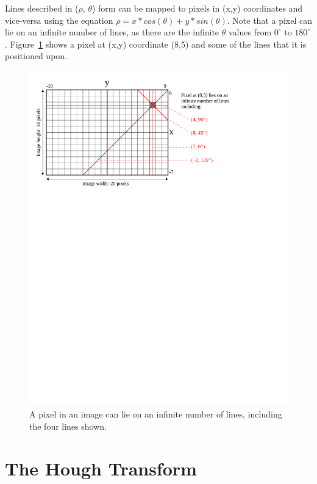 \documentclass[epsfig,10pt,fullpage]{article}
\begin{document}
Lines described in ($\rho$, $\theta$) form can be mapped to pixels in (x,y) coordinates and vice-versa using the equation $\rho = x*cos(\theta) + y*sin(\theta)$. 
Note that a pixel can lie on an infinite number of lines, as there are the infinite $\theta$ values from $0^\circ$ to $180^\circ$.
Figure~\ref{fig:pixel_to_lines} shows a pixel at (x,y) coordinate (8,5) and some of the lines that it is positioned upon.

\begin{figure}[H]
   \begin{center}
       \includegraphics[scale = 0.95]{figures/fig_pixel_to_lines}
   \end{center}
   \caption{A pixel in an image can lie on an infinite number of lines, including the four lines shown.}
	\label{fig:pixel_to_lines}
\end{figure}


\pagebreak

\section*{The Hough Transform}
\end{document}
